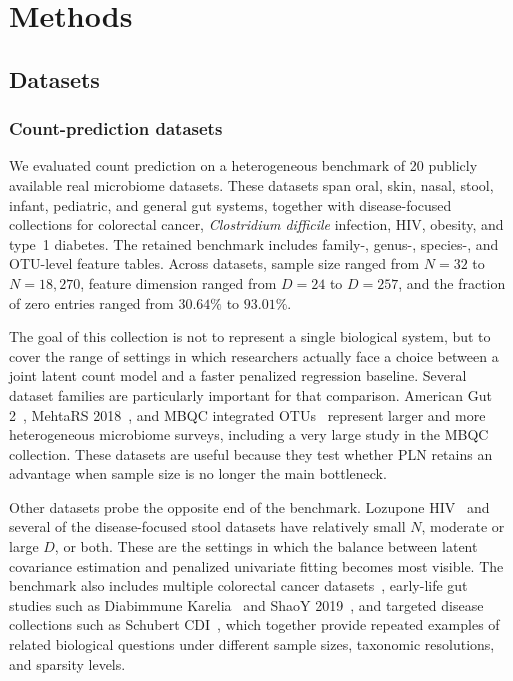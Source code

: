 \documentclass[useAMS,usenatbib,referee]{biom}
\begin{document}
\section{Methods}
\subsection{Datasets}
\subsubsection{Count-prediction datasets}
\label{subsec:count-prediction-datasets}
We evaluated count prediction on a heterogeneous benchmark of 20 publicly available real microbiome datasets.
These datasets span oral, skin, nasal, stool, infant, pediatric, and general gut systems, together with disease-focused collections for colorectal cancer, \textit{Clostridium difficile} infection, HIV, obesity, and type~1 diabetes.
The retained benchmark includes family-, genus-, species-, and OTU-level feature tables.
Across datasets, sample size ranged from $N=32$ to $N=18{,}270$, feature dimension ranged from $D=24$ to $D=257$, and the fraction of zero entries ranged from $30.64\%$ to $93.01\%$.

The goal of this collection is not to represent a single biological system, but to cover the range of settings in which researchers actually face a choice between a joint latent count model and a faster penalized regression baseline.
Several dataset families are particularly important for that comparison.
American Gut 2~\citep{McDonald2018}, MehtaRS 2018~\citep{Mehta2018}, and MBQC integrated OTUs~\citep{MBQC2017} represent larger and more heterogeneous microbiome surveys, including a very large study in the MBQC collection.
These datasets are useful because they test whether PLN retains an advantage when sample size is no longer the main bottleneck.

Other datasets probe the opposite end of the benchmark.
Lozupone HIV~\citep{Lozupone2013} and several of the disease-focused stool datasets have relatively small $N$, moderate or large $D$, or both.
These are the settings in which the balance between latent covariance estimation and penalized univariate fitting becomes most visible.
The benchmark also includes multiple colorectal cancer datasets~\citep{Wang2012, Zeller2014}, early-life gut studies such as Diabimmune Karelia~\citep{Vatanen2016} and ShaoY 2019~\citep{Shao2019}, and targeted disease collections such as Schubert CDI~\citep{Schubert2014}, which together provide repeated examples of related biological questions under different sample sizes, taxonomic resolutions, and sparsity levels.
\end{document}
